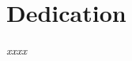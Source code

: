 \chapter*{ \textbf{\Large \sc Dedication}}
\vspace{50pt}




\begin{center}
{\centering \it xxxx}
\end{center}